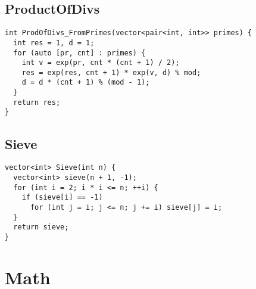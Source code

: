 \documentclass[twoside]{article}
\begin{document}
\begin{multicols*}{2}
{
\subsection*{ProductOfDivs}
}
\begin{verbatim}
int ProdOfDivs_FromPrimes(vector<pair<int, int>> primes) {
  int res = 1, d = 1;
  for (auto [pr, cnt] : primes) {
    int v = exp(pr, cnt * (cnt + 1) / 2);
    res = exp(res, cnt + 1) * exp(v, d) % mod;
    d = d * (cnt + 1) % (mod - 1);
  }
  return res;
}
\end{verbatim}

{
\subsection*{Sieve}
}
\begin{verbatim}
vector<int> Sieve(int n) {
  vector<int> sieve(n + 1, -1);
  for (int i = 2; i * i <= n; ++i) {
    if (sieve[i] == -1)
      for (int j = i; j <= n; j += i) sieve[j] = i;
  }
  return sieve;
}
\end{verbatim}

{
\section*{Math}
}
{
}
\end{multicols*}
\end{document}
